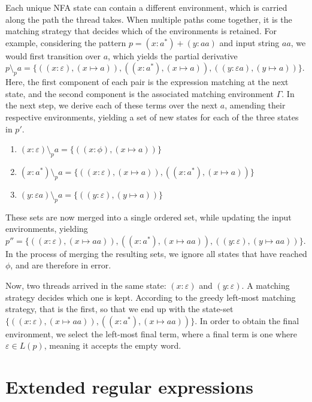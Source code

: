 Each unique NFA state can contain a different environment, which is carried
along the path the thread takes. When multiple paths come together, it is the
matching strategy that decides which of the environments is retained. For
example, considering the pattern $p = (x:a^*) + (y:aa)$ and input string $aa$,
we would first transition over $a$, which yields the partial derivative $p
\setminus_p a = \{ ((x:\varepsilon), (x \mapsto a)), ((x:a^*), (x \mapsto a)),
((y:\varepsilon a), (y \mapsto a)) \}$. Here, the first component of each pair
is the expression matching at the next state, and the second component is the
associated matching environment $\Gamma$. In the next step, we derive each of
these terms over the next $a$, amending their respective environments, yielding
a set of new states for each of the three states in $p'$.

\begin{enumerate}
   \item
      $(x:\varepsilon) \setminus_p a = \{ ((x:\phi), (x \mapsto a)) \}$
   \item
      $(x:a^*) \setminus_p a = \{
         ((x:\varepsilon), (x \mapsto a)),
         ((x:a^*), (x \mapsto a))
      \}$
   \item
      $(y:\varepsilon a) \setminus_p a = \{ ((y:\varepsilon), (y \mapsto a)) \}$
\end{enumerate}

These sets are now merged into a single ordered set, while updating the input
environments, yielding $p'' = \{ ((x:\varepsilon), (x \mapsto aa)), ((x:a^*), (x
\mapsto aa)), ((y:\varepsilon), (y \mapsto aa)) \}$. In the process of merging
the resulting sets, we ignore all states that have reached $\phi$, and are
therefore in error.

Now, two threads arrived in the same state: $(x:\varepsilon)$ and
$(y:\varepsilon)$. A matching strategy decides which one is kept. According to
the greedy left-most matching strategy, that is the first, so that we end up
with the state-set $\{ ((x:\varepsilon), (x \mapsto aa)), ((x:a^*), (x \mapsto
aa)) \}$. In order to obtain the final environment, we select the left-most
final term, where a final term is one where $\varepsilon \in L(p)$, meaning it
accepts the empty word.


\section{Extended regular expressions}

